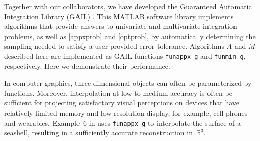 \documentclass[review]{elsarticle}
\theoremstyle{definition}
\newcommand{\funappxg}{\texttt{funappx\_g}\xspace}
\newcommand{\funming}{\texttt{funmin\_g}\xspace}
\begin{document}
Together with our collaborators, we have developed the Guaranteed Automatic
Integration Library (GAIL) \cite{ChoEtal15a}. This MATLAB software library
implements algorithms that provide answers to univariate and multivariate
integration problems, as well as \eqref{appxprob} and \eqref{optprob}, by
automatically determining the sampling needed to satisfy a user provided error
tolerance. Algorithms $A$ and $M$ described here are implemented as GAIL
functions \funappxg{} and \funming, respectively. Here we demonstrate their
performance.

In computer graphics, three-dimensional objects can often be parameterized by
functions. Moreover, interpolation at low to medium accuracy is often be
sufficient for projecting satisfactory visual perceptions on devices that have
relatively limited memory and low-resolution display, for example, cell phones
and wearables. Example~6 in \cite[Chapter~3, Section~6]{Din15a} uses \funappxg{}
to interpolate the surface of a seashell, resulting in a sufficiently accurate
reconstruction in~$\mathbb{R}^3$.
\end{document}
